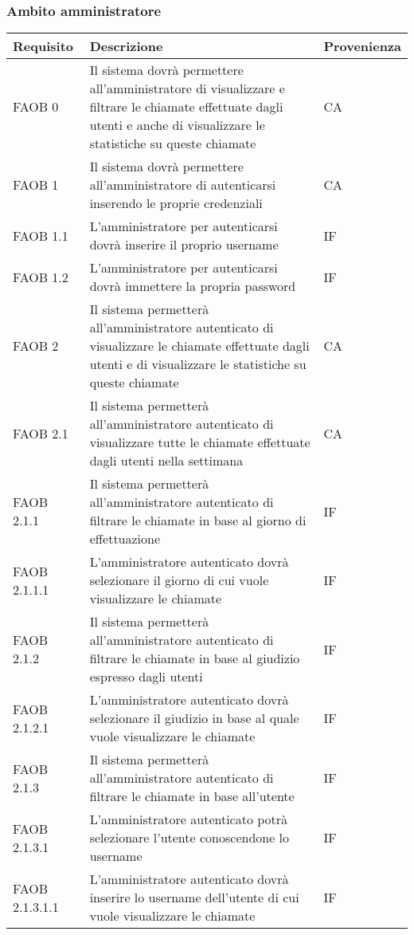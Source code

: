 \subsubsection{Ambito amministratore}
\begin{longtable}{p{} p{} p{} }
\rowcolors{2}{light}{}
\textbf{Requisito} & \textbf{Descrizione} & \textbf{Provenienza} \\
\midrule
\midrule
FAOB 0 & Il sistema dovrà permettere all'amministratore di visualizzare e filtrare le chiamate effettuate dagli utenti e anche di visualizzare le statistiche su queste chiamate & CA\\

\midrule
FAOB 1 & Il sistema dovrà permettere all'amministratore di autenticarsi inserendo le proprie credenziali & CA\\
\midrule
FAOB 1.1 & L'amministratore per autenticarsi dovrà inserire il proprio username & IF\\
\midrule
FAOB 1.2 & L'amministratore per autenticarsi dovrà immettere la propria password & IF\\

\midrule
FAOB 2 & Il sistema permetterà all'amministratore autenticato di visualizzare le chiamate effettuate dagli utenti e di visualizzare le statistiche su queste chiamate & CA\\

\midrule
FAOB 2.1 & Il sistema permetterà all'amministratore autenticato di visualizzare tutte le chiamate effettuate dagli utenti nella settimana & CA\\

\midrule
FAOB 2.1.1 & Il sistema permetterà all'amministratore autenticato di filtrare le chiamate in base al giorno di effettuazione & IF\\
\midrule
FAOB 2.1.1.1 & L'amministratore autenticato dovrà selezionare il giorno di cui vuole visualizzare le chiamate & IF\\

\midrule
FAOB 2.1.2 & Il sistema permetterà all'amministratore autenticato di filtrare le chiamate in base al giudizio espresso dagli utenti & IF\\
\midrule
FAOB 2.1.2.1 & L'amministratore autenticato dovrà selezionare il giudizio in base al quale vuole visualizzare le chiamate & IF\\

\midrule
FAOB 2.1.3 & Il sistema permetterà all'amministratore autenticato di filtrare le chiamate in base all'utente & IF\\
\midrule
FAOB 2.1.3.1 & L'amministratore autenticato potrà selezionare l'utente conoscendone lo username & IF\\
\midrule
FAOB 2.1.3.1.1 & L'amministratore autenticato dovrà inserire lo username dell'utente di cui vuole visualizzare le chiamate & IF\\


\end{longtable}
